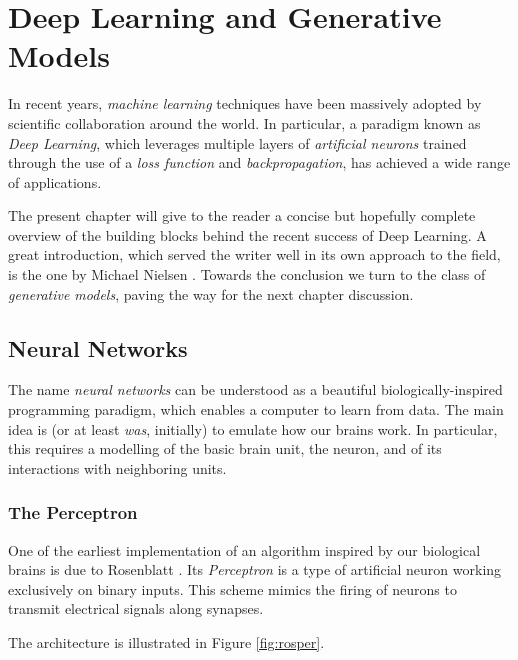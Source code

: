 \chapter{Deep Learning and Generative Models}\label{ch:dlgm}

In recent years, \emph{machine learning} techniques have been massively adopted by scientific collaboration around the world. In particular, a paradigm known as \emph{Deep Learning}, which leverages multiple layers of \emph{artificial neurons} trained through the use of a \emph{loss function} and \emph{backpropagation}, has achieved a wide range of applications.

The present chapter will give to the reader a concise but hopefully complete overview of the building blocks behind the recent success of Deep Learning. A great introduction, which served the writer well in its own approach to the field, is the one by Michael Nielsen \cite{nielsenneural}. Towards the conclusion we turn to the class of \emph{generative models}, paving the way for the next chapter discussion.
	

\section{Neural Networks}

The name \emph{neural networks} can be understood as a beautiful biologically-inspired programming paradigm, which enables a computer to learn from data. The main idea is (or at least \emph{was}, initially) to emulate how our brains work. In particular, this requires a modelling of the basic brain unit, the neuron, and of its interactions with neighboring units.

\subsection{The Perceptron}

One of the earliest implementation of an algorithm inspired  by our biological brains is due to Rosenblatt \cite{Rosenblatt1958ThePA}. Its \emph{Perceptron} is a type of artificial neuron working exclusively on binary inputs. This scheme mimics the firing of neurons to transmit electrical signals along synapses.

The architecture is illustrated in Figure \ref{fig:rosper}.

